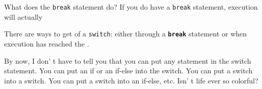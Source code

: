 What does the \texttt{break} statement do? If you do  have a
\texttt{break} statement, execution will actually 

There are  ways to get  of a \texttt{switch}:
either through a \texttt{\textbf{break}} statement or when execution has
reached the .

By now, I don' t have to tell you that you can put any
statement in the switch statement. You can put an if or an if-else into
the switch. You can put a switch into a switch. You can put a switch
into an if-else, etc. Isn' t life ever so colorful?

